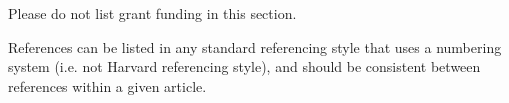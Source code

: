 \documentclass[10pt,a4paper,twocolumn]{article}
\begin{document}
Please do not list grant funding in this section.


{\small
}

\bigskip
References can be listed in any standard referencing style that uses a numbering system
(i.e. not Harvard referencing style), and should be consistent between references within
a given article.








\end{document}
